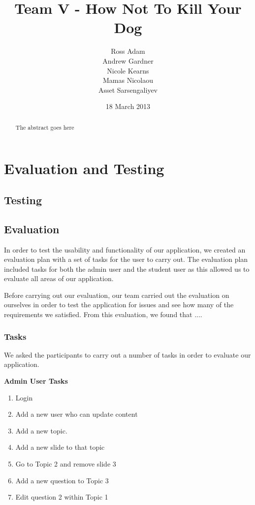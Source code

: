 \documentclass{l3proj}
\begin{document}
\title{Team V - How Not To Kill Your Dog}
\author{Ross Adam \\
        Andrew Gardner \\
        Nicole Kearns \\
        Mamas Nicolaou \\
        Asset Sarsengaliyev}
\date{18 March 2013}
\maketitle
\begin{abstract}

The abstract goes here

\end{abstract}
\educationalconsent
\tableofcontents

\chapter{Evaluation and Testing}
\label{evaluation}

\section{Testing}

\section{Evaluation}

In order to test the usability and functionality of our application, we created an evaluation plan with a set of tasks for the user to carry out. The evaluation plan included tasks for both the admin user and the student user as this allowed us to evaluate all areas of our application.

Before carrying out our evaluation, our team carried out the evaluation on ourselves in order to test the application for issues and see how many of the requirements we satisfied. From this evaluation,  we found that ....

\subsection{Tasks}

We asked the participants to carry out a number of tasks in order to evaluate our application.

\textbf{Admin User Tasks}

\begin{enumerate}
\item Login
\item Add a new user who can update content
\item Add a new topic.
\item Add a new slide to that topic
\item Go to Topic 2 and remove slide 3
\item Add a new question to Topic 3
\item Edit question 2 within Topic 1
\end{enumerate}
\end{document}
